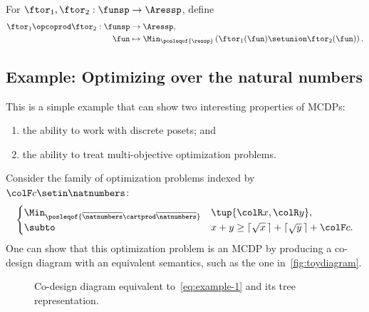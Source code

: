 \begin{definition}
    \label{def:opcoprod}
    For $\ftor_{1},\ftor_{2}:\funsp\rightarrow\Aressp$,
    define
    \begin{align*}
        \ftor_{1}\opcoprod\ftor_{2}:\funsp & \rightarrow\Aressp, \\
        \fun                               & \mapsto\Min_{\posleqof{\ressp}}\left(\ftor_{1}(\fun)\setunion\ftor_{2}(\fun)\right).
    \end{align*}
\end{definition}

\subsection{Example: Optimizing over the natural numbers}

This is a simple example that can show two interesting properties of MCDPs:
\begin{enumerate}
    \item the ability to work with discrete posets; and
    \item the ability to treat multi-objective optimization problems.
\end{enumerate}
Consider the family of optimization problems indexed by~${\colF c}\setin\natnumbers$:
\begin{equation}
    \begin{cases}
        \Min_{\posleqof{\overline{\natnumbers}\cartprod\overline{\natnumbers}}} & \tup{ {\colR x},{\colR y}} ,                                    \\
        \subto                                                                  & x+y\geq\lceil\sqrt{x}\,\rceil+\lceil\sqrt{y}\,\rceil+{\colF c}.
    \end{cases}\label{eq:example-1}
\end{equation}
One can show that this optimization problem is an MCDP by producing a co-design diagram with an equivalent semantics, such as the one in~\cref{fig:toydiagram}.

\begin{figure}[h]

    \caption{Co-design diagram equivalent to~\cref{eq:example-1} and its tree representation.}
\end{figure}

